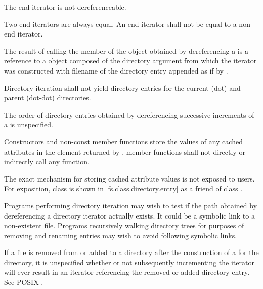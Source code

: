 \pnum
The end iterator is not dereferenceable.

\pnum
Two end iterators are always equal. An end iterator shall not be equal to a non-end
iterator.

\pnum
The result of calling the  member of the  object obtained by dereferencing a  is a reference to a  object composed of the directory argument from which the iterator was
constructed with filename of the directory entry appended as if by .

\pnum
Directory iteration shall not yield directory entries for the current (dot)
and parent (dot-dot) directories.

\pnum
The order of directory entries obtained by dereferencing successive
increments of a  is unspecified.

\pnum
Constructors and non-const  member functions
store the values of any cached attributes
in the  element returned by .
 member functions shall not directly or indirectly call
any   function.
\begin{note}
The exact mechanism for storing cached attribute values is not exposed to users.
For exposition, class  is shown in \ref{fs.class.directory.entry}
as a friend of class .
\end{note}

\pnum
\begin{note}
Programs performing directory iteration may wish to test if the
path obtained by dereferencing a directory iterator actually exists. It could be
a symbolic link to a non-existent file. Programs recursively
walking directory trees for purposes of removing and renaming entries may wish
to avoid following symbolic links.
\end{note}

\pnum
\begin{note}
If a file  is removed from or added to a directory after the
construction of a  for the directory, it is
unspecified whether or not subsequently incrementing the iterator will ever
result in an iterator referencing the removed or added directory entry. See
POSIX .
\end{note}

